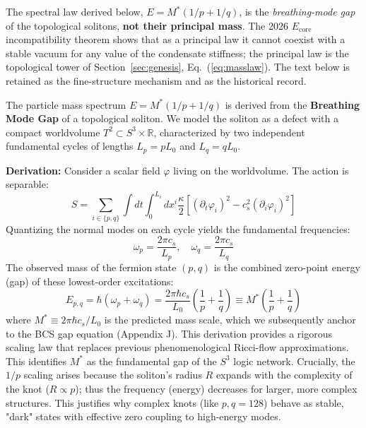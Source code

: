\documentclass[a4paper,12pt]{article}
\begin{document}
\begin{mdframed}[backgroundcolor=red!5, frametitle={Erratum (2026 campaign) --- status of this section}]
The spectral law derived below, $E=M^*(1/p+1/q)$, is the \emph{breathing-mode gap} of the topological solitons, \textbf{not their principal mass}. The 2026 $E_{\mathrm{core}}$ incompatibility theorem shows that as a principal law it cannot coexist with a stable vacuum for any value of the condensate stiffness; the principal law is the topological tower of Section~\ref{sec:genesis}, Eq.~(\ref{eq:masslaw}). The text below is retained as the fine-structure mechanism and as the historical record.
\end{mdframed}
The particle mass spectrum $E = M^*(1/p + 1/q)$ is derived from the \textbf{Breathing Mode Gap} of a topological soliton. We model the soliton as a defect with a compact worldvolume $T^2 \subset S^3 \times \mathbb{R}$, characterized by two independent fundamental cycles of lengths $L_p = p L_0$ and $L_q = q L_0$.

\textbf{Derivation:}
Consider a scalar field $\varphi$ living on the worldvolume. The action is separable:
\begin{equation}
    S = \sum_{i \in \{p,q\}} \int dt \int_0^{L_i} dx^i \frac{\kappa}{2} \left[ (\partial_t \varphi_i)^2 - c_s^2 (\partial_i \varphi_i)^2 \right]
\end{equation}
Quantizing the normal modes on each cycle yields the fundamental frequencies:
\begin{equation}
    \omega_p = \frac{2\pi c_s}{L_p}, \quad \omega_q = \frac{2\pi c_s}{L_q}
\end{equation}
The observed mass of the fermion state $(p, q)$ is the combined zero-point energy (gap) of these lowest-order excitations:
\begin{equation}
    E_{p,q} = \hbar (\omega_p + \omega_q) = \frac{2\pi \hbar c_s}{L_0} \left( \frac{1}{p} + \frac{1}{q} \right) \equiv M^* \left( \frac{1}{p} + \frac{1}{q} \right)
\end{equation}
where $M^* \equiv 2\pi \hbar c_s / L_0$ is the predicted mass scale, which we subsequently anchor to the BCS gap equation (Appendix J). This derivation provides a rigorous scaling law that replaces previous phenomenological Ricci-flow approximations.
This identifies $M^*$ as the fundamental gap of the $S^3$ logic network. Crucially, the $1/p$ scaling arises because the soliton's radius $R$ expands with the complexity of the knot ($R \propto p$); thus the frequency (energy) decreases for larger, more complex structures. This justifies why complex knots (like $p,q=128$) behave as stable, "dark" states with effective zero coupling to high-energy modes.
\end{document}
